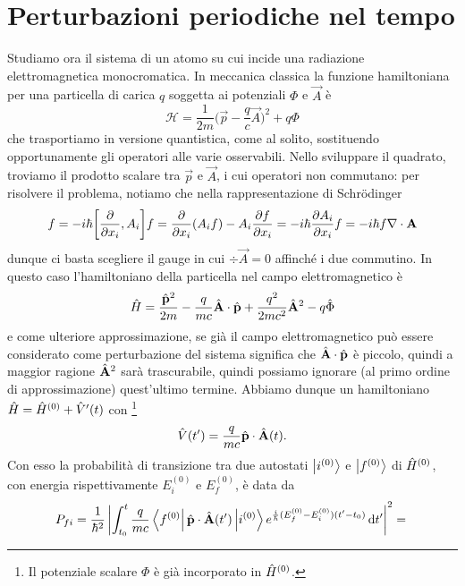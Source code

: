 \section{Perturbazioni periodiche nel tempo}
Studiamo ora il sistema di un atomo su cui incide una radiazione elettromagnetica monocromatica.
In meccanica classica la funzione hamiltoniana per una particella di carica $q$ soggetta ai potenziali $\Phi$ e $\vec A$ è
\begin{equation}
	\mathcal H=\frac1{2m}\bigg(\vec p-\frac{q}{c}\vec A\bigg)^2+q\Phi
	\label{eq:hamiltoniana-potenziale-elettromagnetico}
\end{equation}
che trasportiamo in versione quantistica, come al solito, sostituendo opportunamente gli operatori alle varie osservabili.
Nello sviluppare il quadrato, troviamo il prodotto scalare tra $\vec p$ e $\vec A$, i cui operatori non commutano: per risolvere il problema, notiamo che nella rappresentazione di Schr\"odinger
\begin{equation}
	[\op p_i,\op A_i]f=-i\hbar\bigg[\drp{}{x_i},A_i\bigg]f=\drp{}{x_i}(A_if)-A_i\drp{f}{x_i}=-i\hbar\drp{A_i}{x_i}f=-i\hbar f\div\vec A
	\label{eq:commutatore-impulso-potenziale-vettore}
\end{equation}
dunque ci basta scegliere il gauge in cui $\div\vec A=0$ affinch\'e i due commutino.
In questo caso l'hamiltoniano della particella nel campo elettromagnetico è
\begin{equation}
	\hat{H}=\frac{\hat{\mathbf{p}}^2}{2m}-\frac{q}{mc}{\hat{\mathbf{A}}}\cdot{\hat{\mathbf{p}}}+\frac{q^2}{2mc^2}\hat{\mathbf{A}}^2-q\hat{\Phi}
	\label{eq:hamiltoniano-campo-elettromagnetico}
\end{equation}
e come ulteriore approssimazione, se già il campo elettromagnetico può essere considerato come perturbazione del sistema significa che ${\hat{\mathbf{A}}}\cdot{\hat{\mathbf{p}}}$ è piccolo, quindi a maggior ragione $\hat{\mathbf{A}}^2$ sarà trascurabile, quindi possiamo ignorare (al primo ordine di approssimazione) quest'ultimo termine.
Abbiamo dunque un hamiltoniano $\hat{H}=\hat{H}^{(0)}+\hat{V}'(t)$ con
\footnote{Il potenziale scalare $\Phi$ è già incorporato in $\hat{H}^{(0)}$.}
\begin{equation}
	\hat{V}(t')=\frac{q}{mc}{\hat{\mathbf{p}}}\cdot{\hat{\mathbf{A}}}(t).
\end{equation}
Con esso la probabilità di transizione tra due autostati $\left|{i^{(0)}}\right\rangle$ e $\left|{f^{(0)}}\right\rangle$ di $\hat{H}^{(0)}$, con energia rispettivamente $E_i^{(0)}$ e $E_f^{(0)}$, è data da
\begin{equation}
	P_{fi}=\frac1{\hbar^2}\left|{\int_{t_0}^t\frac{q}{mc}\left\langle{f^{(0)}}\right|{\hat{\mathbf{p}}}\cdot{\hat{\mathbf{A}}}(t')\left|{i^{(0)}}\right\rangle e^{\frac{i}{\hbar}(E_f^{(0)}-E_i^{(0)})(t'-t_0)}\,\textup{d} t'}\right|^2=\\
\end{equation}
